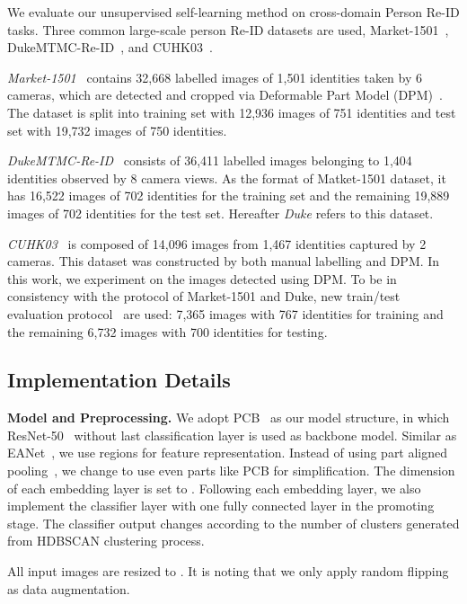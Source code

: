 \documentclass[10pt,twocolumn,letterpaper]{article}
\begin{document}
We evaluate our unsupervised self-learning method on cross-domain Person Re-ID tasks. Three common large-scale person Re-ID datasets are used, Market-1501~\cite{market1501}, DukeMTMC-Re-ID~\cite{duke}, and CUHK03~\cite{cuhk03}.

\textit{Market-1501}~\cite{market1501} contains 32,668 labelled images of 1,501 identities taken by 6 cameras, which are detected and cropped via Deformable Part Model (DPM)~\cite{DPM}. The dataset is split into training set with 12,936 images of 751 identities and test set with 19,732 images of 750 identities. 

\textit{DukeMTMC-Re-ID}~\cite{duke} consists of 36,411 labelled images belonging to 1,404 identities observed by 8 camera views. As the format of Matket-1501 dataset, it has 16,522 images of 702 identities for the training set and the remaining 19,889 images of 702 identities for the test set. 
Hereafter \emph{Duke} refers to this dataset.

\textit{CUHK03}~\cite{cuhk03} is composed of 14,096 images from 1,467 identities captured by 2 cameras. This dataset was constructed by both manual labelling and DPM. In this work, we experiment on the images detected using DPM. To be in consistency with the protocol of Market-1501 and Duke, new train/test evaluation protocol~\cite{rerank} are used: 7,365 images with 767 identities for training and the remaining 6,732 images with 700 identities for testing.

\subsection{Implementation Details}
\textbf{Model and Preprocessing.} We adopt PCB~\cite{PCB} as our model structure, in which ResNet-50~\cite{resnet50} without last classification layer is used as backbone model. Similar as EANet~\cite{EANet}, we use  regions for feature representation. Instead of using part aligned pooling~\cite{EANet}, we change to use even parts like PCB for simplification. The dimension of each embedding layer is set to . Following each embedding layer, we also implement the classifier layer with one fully connected layer in the promoting stage. The classifier output changes according to the number of clusters generated from HDBSCAN clustering process.

All input images are resized to . It is noting that we only apply random flipping as data augmentation.
\end{document}
